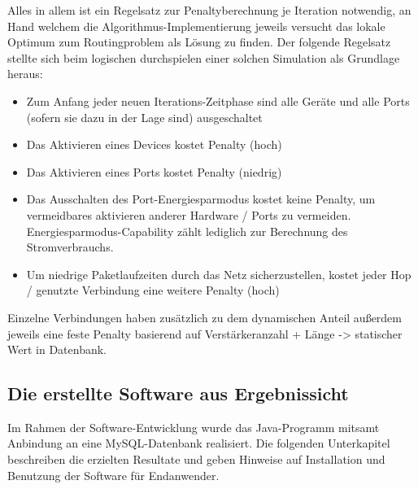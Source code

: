 Alles in allem ist ein Regelsatz zur Penaltyberechnung je Iteration notwendig, an Hand welchem die Algorithmus-Implementierung jeweils versucht das lokale Optimum zum Routingproblem als Lösung zu finden.
Der folgende Regelsatz stellte sich beim logischen durchspielen einer solchen Simulation als Grundlage heraus:
\begin{itemize}
	\item Zum Anfang jeder neuen Iterations-Zeitphase sind alle Geräte und alle Ports (sofern sie dazu in der Lage sind) ausgeschaltet
	\item Das Aktivieren eines Devices kostet Penalty (hoch)
	\item Das Aktivieren eines Ports kostet Penalty (niedrig)
	\item Das Ausschalten des Port-Energiesparmodus kostet keine Penalty, um vermeidbares aktivieren anderer Hardware / Ports zu vermeiden. Energiesparmodus-Capability zählt lediglich zur Berechnung des Stromverbrauchs.
	\item Um niedrige Paketlaufzeiten durch das Netz sicherzustellen, kostet jeder Hop / genutzte Verbindung eine weitere Penalty (hoch)
\end{itemize}
Einzelne Verbindungen haben zusätzlich zu dem dynamischen Anteil außerdem jeweils eine feste Penalty basierend auf Verstärkeranzahl + Länge -> statischer Wert in Datenbank.



\subsection{Die erstellte Software aus Ergebnissicht}\label{subsec:ErgSoftware}
Im Rahmen der Software-Entwicklung wurde das Java-Programm  mitsamt Anbindung an eine MySQL-Datenbank realisiert. Die folgenden Unterkapitel beschreiben die erzielten Resultate und geben Hinweise auf Installation und Benutzung der Software für Endanwender.

